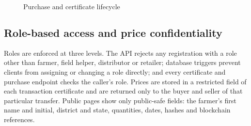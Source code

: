 \begin{figure}[!ht]
\centering
{}
\caption{Purchase and certificate lifecycle}
\label{fig:lifecycle}
\end{figure}

\subsection*{Role-based access and price confidentiality}
Roles are enforced at three levels. The API rejects any registration with a role other than farmer, field helper, distributor or retailer; database triggers prevent clients from assigning or changing a role directly; and every certificate and purchase endpoint checks the caller's role. Prices are stored in a restricted field of each transaction certificate and are returned only to the buyer and seller of that particular transfer. Public pages show only public-safe fields: the farmer's first name and initial, district and state, quantities, dates, hashes and blockchain references.

